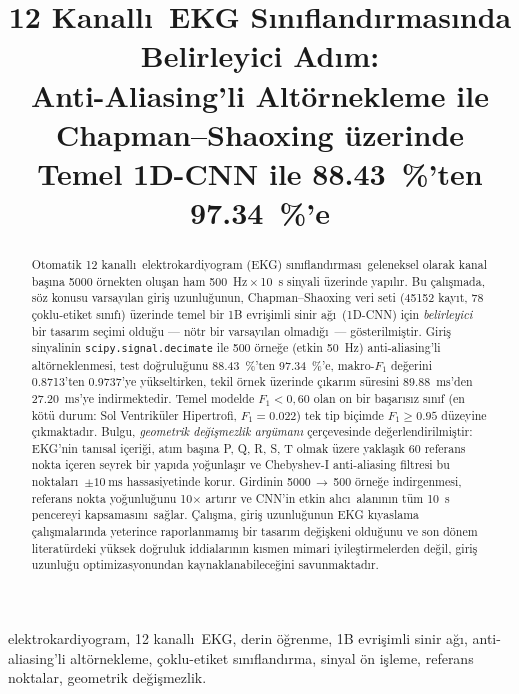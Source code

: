 \documentclass[conference]{IEEEtran}
\title{12 Kanall\i\ EKG S\i n\i fland\i rmas\i nda Belirleyici Ad\i m: \\
       Anti-Aliasing'li Alt\"{o}rnekleme ile Chapman--Shaoxing \"{u}zerinde \\
       Temel 1D-CNN ile \SI{88,43}{\percent}'ten \SI{97,34}{\percent}'e}
\author{\IEEEauthorblockN{Elaman Nazarkulov}
\IEEEauthorblockA{Bilgisayar M\"{u}hendisli\u{g}i B\"{o}l\"{u}m\"{u} \\
K\i rg\i z--T\"{u}rk Manas \"{U}niversitesi \\
Bi\c{s}kek, K\i rg\i zistan \\
elaman.job@gmail.com}}
\begin{document}
\maketitle

\begin{abstract}
Otomatik 12 kanall\i\ elektrokardiyogram (EKG) s\i n\i fland\i rmas\i\
geleneksel olarak kanal ba\c{s}\i na \num{5000} \"{o}rnekten olu\c{s}an
ham \SI{500}{\hertz}\,$\times$\,\SI{10}{\second} sinyali \"{u}zerinde
yap\i l\i r. Bu \c{c}al\i\c{s}mada, s\"{o}z konusu varsay\i lan giri\c{s}
uzunlu\u{g}unun, Chapman--Shaoxing veri seti (\num{45152} kay\i t,
\num{78} \c{c}oklu-etiket s\i n\i f\i ) \"{u}zerinde temel bir 1B
evri\c{s}imli sinir a\u{g}\i\ (1D-CNN) i\c{c}in
\emph{belirleyici} bir tasar\i m se\c{c}imi oldu\u{g}u --- n\"{o}tr bir
varsay\i lan olmad\i\u{g}\i\ --- g\"{o}sterilmi\c{s}tir. Giri\c{s}
sinyalinin \texttt{scipy.signal.decimate} ile \num{500} \"{o}rne\u{g}e
(etkin \SI{50}{\hertz}) anti-aliasing'li alt\"{o}rneklenmesi, test
do\u{g}rulu\u{g}unu \SI{88,43}{\percent}'ten \SI{97,34}{\percent}'e,
makro-$F_1$ de\u{g}erini \num{0,8713}'ten \num{0,9737}'ye
y\"{u}kseltirken, tekil \"{o}rnek \"{u}zerinde \c{c}\i kar\i m s\"{u}resini
\SI{89,88}{\milli\second}'den \SI{27,20}{\milli\second}'ye
indirmektedir. Temel modelde $F_1<0,60$ olan on bir ba\c{s}ar\i s\i z
s\i n\i f (en k\"{o}t\"{u} durum: Sol Ventrik\"{u}ler Hipertrofi,
$F_1=\num{0,022}$) tek tip bi\c{c}imde $F_1\geq \num{0,95}$ d\"{u}zeyine
\c{c}\i kmaktad\i r. Bulgu, \emph{geometrik de\u{g}i\c{s}mezlik
arg\"{u}man\i} \c{c}er\c{c}evesinde de\u{g}erlendirilmi\c{s}tir: EKG'nin
tan\i sal i\c{c}eri\u{g}i, at\i m ba\c{s}\i na P, Q, R, S, T olmak \"{u}zere
yakla\c{s}\i k \num{60} referans nokta i\c{c}eren seyrek bir yap\i da
yo\u{g}unla\c{s}\i r ve Chebyshev-I anti-aliasing filtresi bu noktalar\i\
$\pm\SI{10}{\milli\second}$ hassasiyetinde korur. Girdinin
\num{5000}\,$\rightarrow$\,\num{500} \"{o}rne\u{g}e indirgenmesi,
referans nokta yo\u{g}unlu\u{g}unu 10$\times$ art\i r\i r ve CNN'in
etkin al\i c\i\ alan\i n\i n t\"{u}m \SI{10}{\second} pencereyi
kapsamas\i n\i\ sa\u{g}lar. \c{C}al\i\c{s}ma, giri\c{s} uzunlu\u{g}unun
EKG k\i yaslama \c{c}al\i\c{s}malar\i nda yeterince raporlanmam\i\c{s}
bir tasar\i m de\u{g}i\c{s}keni oldu\u{g}unu ve son d\"{o}nem
literat\"{u}rdeki y\"{u}ksek do\u{g}ruluk iddialar\i n\i n k\i smen mimari
iyile\c{s}tirmelerden de\u{g}il, giri\c{s} uzunlu\u{g}u optimizasyonundan
kaynaklanabilece\u{g}ini savunmaktad\i r.
\end{abstract}

\begin{IEEEkeywords}
elektrokardiyogram, 12 kanall\i\ EKG, derin \"{o}\u{g}renme, 1B
evri\c{s}imli sinir a\u{g}\i, anti-aliasing'li alt\"{o}rnekleme,
\c{c}oklu-etiket s\i n\i fland\i rma, sinyal \"{o}n i\c{s}leme,
referans noktalar, geometrik de\u{g}i\c{s}mezlik.
\end{IEEEkeywords}
\end{document}
